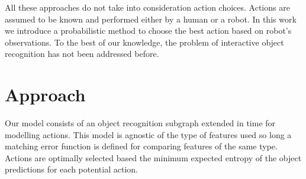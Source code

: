 \documentclass[conference]{IEEEtran}
\begin{document}

    All these approaches do not take into consideration action choices. Actions are assumed to be known and performed either by a human or a robot. In this work we introduce a probabilistic method to choose the best action based on robot's observations. To the best of our knowledge, the problem of interactive object recognition has not been addressed before. 

\section{Approach}
    Our model consists of an object recognition subgraph extended in time for modelling actions. 
    This model is agnostic of the type of features used so long a matching error function is defined for comparing features of the same type. Actions are optimally selected based the minimum expected entropy of the object predictions for each potential action.


        
\end{document}

